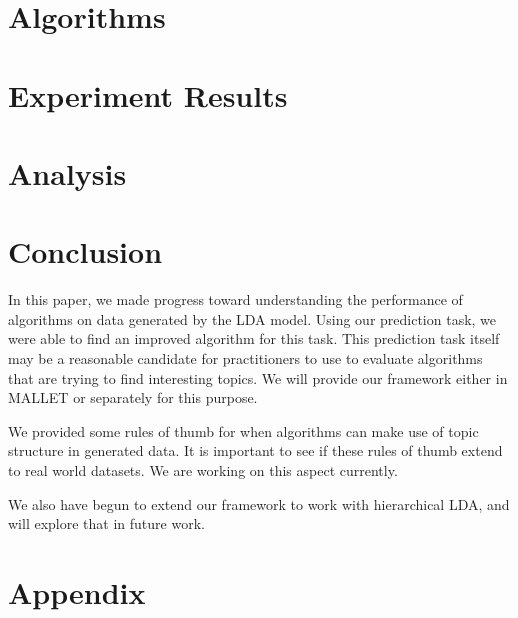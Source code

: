 \documentclass{article}
\begin{document}
\section{Algorithms}
\label{sec:algs}

\section{Experiment Results}
\label{sec:results}


\section{Analysis}
\label{sec:analysis}


\section{Conclusion}
\label{sec:conclusion}

In this paper, we made progress toward understanding the performance
of algorithms on data generated by the LDA model.  Using our
prediction task, we were able to find an improved algorithm for this
task.  This prediction task itself may be a reasonable candidate for
practitioners to use to evaluate algorithms that are trying to find
interesting topics. We will provide our framework either in MALLET
\cite{McCallumMALLET} or separately for this purpose.

We provided some rules of thumb for when algorithms can make
use of topic structure in generated data.  It is important
to see if these rules of thumb extend to real world datasets.
We are working on this aspect currently.

We also have begun to extend our framework to work
with hierarchical LDA, and will explore that 
in future work. 



\section{Appendix}

\end{document}
